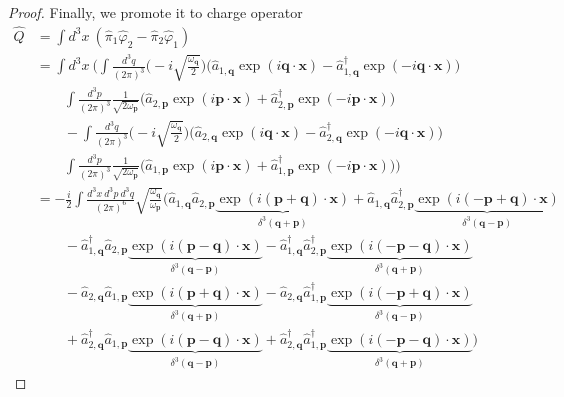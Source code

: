 \begin{proof}
        Finally, we promote it to charge operator 
        \begin{equation*}
        \begin{aligned}
            \hat Q & = \int d^3 x ~ (\hat \pi_1 \hat \varphi_2 - \hat \pi_2 \hat \varphi_1) \\ & = \int d^3 x ~ \Big ( \int \frac{d^3 q}{{(2\pi)}^3} \Big ( - i \sqrt{\frac{\omega_{\mathbf q}}{2}} \Big ) \Big ( \hat a_{1, \mathbf q} \exp(i \mathbf q \cdot \mathbf x) - \hat a_{1, \mathbf q}^\dagger \exp(- i \mathbf q \cdot \mathbf x) \Big) \\ & \qquad \int \frac{d^3 p}{{(2\pi)}^3} \frac{1}{\sqrt{2 \omega_{\mathbf p}}} \Big ( \hat a_{2, \mathbf p} \exp(i \mathbf p \cdot \mathbf x) + \hat a_{2, \mathbf p}^\dagger \exp(- i \mathbf p \cdot \mathbf x) \Big) \\ & \qquad - \int \frac{d^3 q}{{(2\pi)}^3} \Big ( - i \sqrt{\frac{\omega_{\mathbf q}}{2}} \Big ) \Big ( \hat a_{2, \mathbf q} \exp(i \mathbf q \cdot \mathbf x) - \hat a_{2, \mathbf q}^\dagger \exp(- i \mathbf q \cdot \mathbf x) \Big) \\ & \qquad \int \frac{d^3 p}{{(2\pi)}^3} \frac{1}{\sqrt{2 \omega_{\mathbf p}}} \Big ( \hat a_{1, \mathbf p} \exp(i \mathbf p \cdot \mathbf x) + \hat a_{1, \mathbf p}^\dagger \exp(- i \mathbf p \cdot \mathbf x) \Big)  \Big) \\ & = - \frac{i}{2} \int \frac{d^3 x ~ d^3 p ~ d^3 q}{(2\pi)^6} \sqrt{\frac{\omega_{\mathbf q}}{\omega_{\mathbf p}}} \Big ( \hat a_{1, \mathbf q} \hat a_{2, \mathbf p} \underbrace{\exp(i (\mathbf p + \mathbf q) \cdot \mathbf x)}_{\delta^3 (\mathbf q + \mathbf p)} + \hat a_{1, \mathbf q} \hat a_{2, \mathbf p}^\dagger \underbrace{\exp(i (- \mathbf p + \mathbf q) \cdot \mathbf x)}_{\delta^3 (\mathbf q - \mathbf p)} \\ & \qquad - \hat a_{1, \mathbf q}^\dagger \hat a_{2, \mathbf p} \underbrace{\exp(i (\mathbf p - \mathbf q) \cdot \mathbf x)}_{\delta^3 (\mathbf q - \mathbf p)} - \hat a_{1, \mathbf q}^\dagger \hat a_{2, \mathbf p}^\dagger \underbrace{\exp(i (- \mathbf p - \mathbf q) \cdot \mathbf x)}_{\delta^3 (\mathbf q + \mathbf p)} \\ & \qquad - \hat a_{2, \mathbf q} \hat a_{1, \mathbf p} \underbrace{\exp(i (\mathbf p + \mathbf q) \cdot \mathbf x)}_{\delta^3 (\mathbf q + \mathbf p)} - \hat a_{2, \mathbf q} \hat a_{1, \mathbf p}^\dagger \underbrace{\exp(i (- \mathbf p + \mathbf q) \cdot \mathbf x)}_{\delta^3 (\mathbf q - \mathbf p)} \\ & \qquad + \hat a_{2, \mathbf q}^\dagger \hat a_{1, \mathbf p} \underbrace{\exp(i (\mathbf p - \mathbf q) \cdot \mathbf x)}_{\delta^3 (\mathbf q - \mathbf p)} + \hat a_{2, \mathbf q}^\dagger \hat a_{1, \mathbf p}^\dagger \underbrace{\exp(i (- \mathbf p - \mathbf q) \cdot \mathbf x)}_{\delta^3 (\mathbf q + \mathbf p)} \Big) 

\end{aligned}
\end{equation*}
\end{proof}
